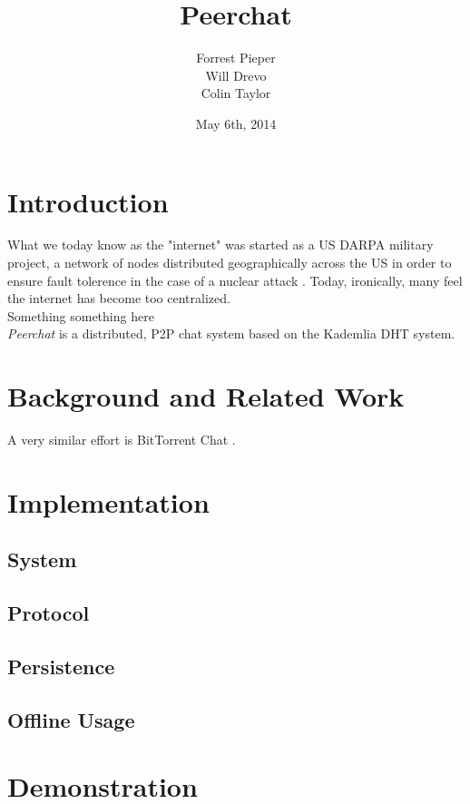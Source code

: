 \documentclass{article}
\title{Peerchat}
\author{
  Forrest Pieper\\
  Will Drevo\\
  Colin Taylor
}
\date{May 6th, 2014}
\begin{document}
\maketitle

\section{Introduction}
\label{introduction}

What we today know as the "internet" was started as a US DARPA military project, a network of nodes distributed geographically across the US in order to ensure fault tolerence in the case of a nuclear attack \cite{?}. Today, ironically, many feel the internet has become too centralized. \\

Something something here \\

\textit{Peerchat} is a distributed, P2P chat system based on the Kademlia DHT \cite{Maymounkov02} system. 

\section{Background and Related Work}

A very similar effort is BitTorrent Chat \cite{?}. 

\section{Implementation}

\subsection{System}
\subsection{Protocol}
\subsection{Persistence}
\subsection{Offline Usage}

\section{Demonstration}
\end{document}
